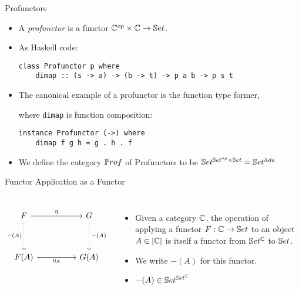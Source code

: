 \begin{frame}[fragile]{Profunctors}
	\begin{itemize}
		\item A \textit{profunctor} is a functor $\mathbb{C}^{op} \times \mathbb{C} \to \mathbb{S}et$.
		\pause\item As Haskell code:
		\begin{lstlisting}
class Profunctor p where
	dimap :: (s -> a) -> (b -> t) -> p a b -> p s t
		\end{lstlisting}
		\pause\item The canonical example of a profunctor is the function type former, 
		
		where \texttt{dimap} is function composition:
		\begin{lstlisting}
instance Profunctor (->) where
	dimap f g h = g . h . f
		\end{lstlisting}
		\pause\item We define the category ${\mathbb{P}rof}$ of Profunctors to be $\mathbb{S}et^{\mathbb{S}et^{op} \times \mathbb{S}et} = \mathbb{S}et^{\mathbb{A}da}$
	\end{itemize}
\end{frame}
\begin{frame}[fragile]{Functor Application as a Functor}
	\begin{columns}
		\[\begin{tikzcd}
			F && G \\
			\\
			{F(A)} && {G(A)}
			\arrow["{\eta}", from=1-1, to=1-3]
			\arrow["{-(A)}"', dotted, from=1-1, to=3-1]
			\arrow["{-(A)}", dotted, from=1-3, to=3-3]
			\arrow["{\eta_A}"', from=3-1, to=3-3]
		\end{tikzcd}\]
		\begin{itemize}
			\item Given a category $\mathbb{C}$, the operation of applying a functor $F : \mathbb{C} \to \mathbb{S}et$ to an object $A \in |\mathbb{C}|$ is itself a functor from $\mathbb{S}et^{\mathbb{C}}$ to $\mathbb{S}et$.
			\pause\item We write $-(A)$ for this functor.
			\pause\item $-(A) \in \mathbb{S}et^{\mathbb{S}et^{\mathbb{C}}}$
		\end{itemize}
	\end{columns}
\end{frame}
